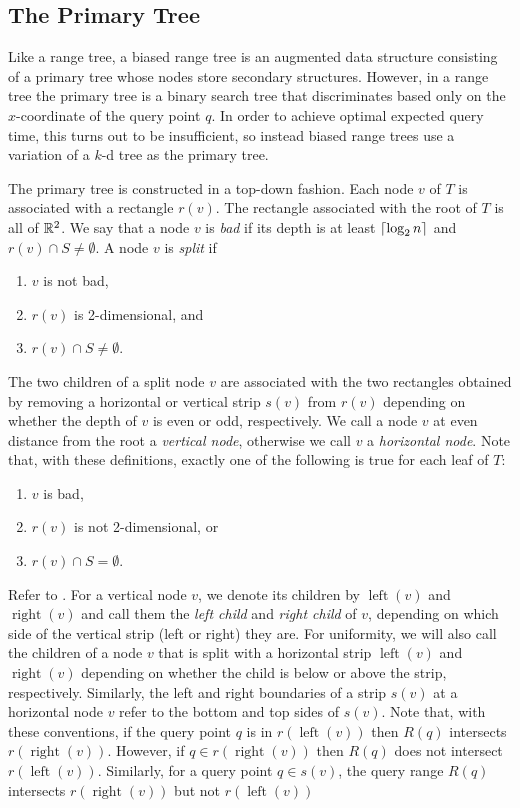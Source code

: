 \documentclass[lotsofwhite,charterfonts]{patmorin}
\DeclareMathOperator{\lft}{left}
\DeclareMathOperator{\rght}{right}
\begin{document}
\subsection{The Primary Tree}

Like a range tree, a biased range tree is an augmented data structure
consisting of a primary tree whose nodes store secondary structures.
However, in a range tree the primary tree is a binary search tree that
discriminates based only on the $x$-coordinate of the query point $q$.
In order to achieve optimal expected query time, this turns out to be
insufficient, so instead biased range trees use a variation of a $k$-d
tree as the primary tree.

The primary tree is constructed in a top-down fashion.  Each node $v$
of $T$ is associated with a rectangle $r(v)$.  The rectangle
associated with the root of $T$ is all of $\mathbb{R}^2$.  We say that a node
$v$ is \emph{bad} if its depth is at least $\left\lceil \log_2 n \right\rceil$ and
$r(v)\cap S \neq \emptyset$. 
A node $v$ is \emph{split} if
\begin{enumerate}
\item $v$ is not bad,
\item $r(v)$ is 2-dimensional, and
\item $r(v)\cap S\neq \emptyset$.
\end{enumerate}
The two children of a split node
$v$ are associated with the two rectangles obtained by removing a
horizontal or vertical strip $s(v)$ from $r(v)$ depending on whether the
depth of $v$ is even or odd, respectively.  We call a node $v$ at even
distance from the root a \emph{vertical node}, otherwise we call $v$ a
\emph{horizontal node}. 
Note that, with these definitions, exactly one of the following is true
for each leaf of $T$:
\begin{enumerate}
\item $v$ is bad, 
\item $r(v)$ is not 2-dimensional, or
\item $r(v)\cap S = \emptyset$.
\end{enumerate}

Refer to .
For a vertical node $v$, we denote its children by $\lft(v)$ and
$\rght(v)$ and call them the \emph{left child} and \emph{right child}
of $v$, depending on which side of the vertical strip (left or right)
they are.  For uniformity, we will also call the children of a node
$v$ that is split with a horizontal strip $\lft(v)$ and $\rght(v)$
depending on whether the child is below or above the strip,
respectively.  Similarly, the left and right boundaries of a strip
$s(v)$ at a horizontal node $v$ refer to the bottom and top sides of
$s(v)$.  Note that, with these conventions, if the query point $q$ is
in $r(\lft(v))$ then $R(q)$ intersects $r(\rght(v))$.  However, if
$q\in r(\rght(v))$ then $R(q)$ does not intersect $r(\lft(v))$.
Similarly, for a query point $q\in s(v)$, the query range
$R(q)$ intersects $r(\rght(v))$ but not $r(\lft(v))$
\end{document}

